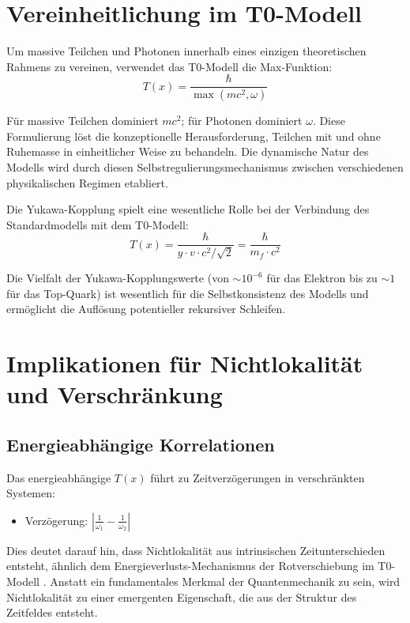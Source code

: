 \documentclass[12pt,a4paper]{article}
\newcommand{\Tfield}{T(x)}
\begin{document}
	\section{Vereinheitlichung im T0-Modell}
	
	Um massive Teilchen und Photonen innerhalb eines einzigen theoretischen Rahmens zu vereinen, verwendet das T0-Modell die Max-Funktion:
	\begin{equation}
		\Tfield = \frac{\hbar}{\max(m c^2, \omega)}
	\end{equation}
	
	Für massive Teilchen dominiert \(m c^2\); für Photonen dominiert \(\omega\). Diese Formulierung löst die konzeptionelle Herausforderung, Teilchen mit und ohne Ruhemasse in einheitlicher Weise zu behandeln. Die dynamische Natur des Modells wird durch diesen Selbstregulierungsmechanismus zwischen verschiedenen physikalischen Regimen etabliert.
	
	Die Yukawa-Kopplung spielt eine wesentliche Rolle bei der Verbindung des Standardmodells mit dem T0-Modell:
	\begin{equation}
		\Tfield = \frac{\hbar}{y \cdot v \cdot c^2/\sqrt{2}} = \frac{\hbar}{m_f \cdot c^2}
	\end{equation}
	
	Die Vielfalt der Yukawa-Kopplungswerte (von \(\sim 10^{-6}\) für das Elektron bis zu \(\sim 1\) für das Top-Quark) ist wesentlich für die Selbstkonsistenz des Modells und ermöglicht die Auflösung potentieller rekursiver Schleifen.
	
	\section{Implikationen für Nichtlokalität und Verschränkung}
	\subsection{Energieabhängige Korrelationen}
	Das energieabhängige \(\Tfield\) führt zu Zeitverzögerungen in verschränkten Systemen:
	\begin{itemize}
		\item Verzögerung: \(\left|\frac{1}{\omega_1} - \frac{1}{\omega_2}\right|\)
	\end{itemize}
	Dies deutet darauf hin, dass Nichtlokalität aus intrinsischen Zeitunterschieden entsteht, ähnlich dem Energieverlusts-Mechanismus der Rotverschiebung im T0-Modell \cite{pascher_messdifferenzen_2025}. Anstatt ein fundamentales Merkmal der Quantenmechanik zu sein, wird Nichtlokalität zu einer emergenten Eigenschaft, die aus der Struktur des Zeitfeldes entsteht.
	
\end{document}
